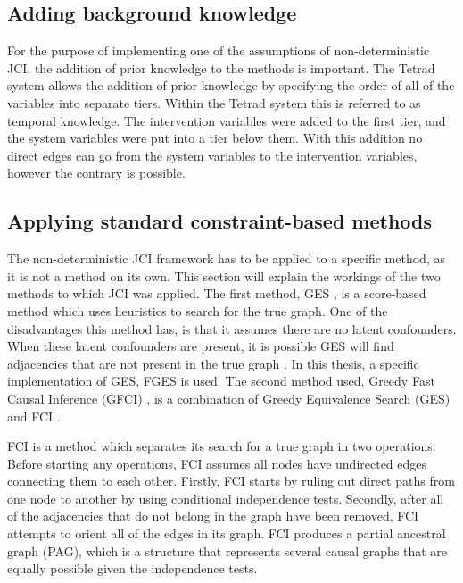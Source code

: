\documentclass[a4paper,pdf]{article}
\newcommand{\Sara}[1]{{\color{blue} Sara: #1}}
\begin{document}
\subsection{Adding background knowledge}
For the purpose of implementing one of the assumptions of non-deterministic JCI, the addition of prior knowledge to the methods is important. The Tetrad system allows the addition of prior knowledge by specifying the order of all of the variables into separate tiers. Within the Tetrad system this is referred to as temporal knowledge. The intervention variables were added to the first tier, and the system variables were put into a tier below them. With this addition no direct edges can go from the system variables to the intervention variables, however the contrary is possible. 

\subsection{Applying standard constraint-based methods}

The non-deterministic JCI framework has to be applied to a specific method, as it is not a method on its own. This section will explain the workings of the two methods to which JCI was applied. The first method, GES \cite{ges}, is a score-based method which uses heuristics to search for the true graph. One of the disadvantages this method has, is that it assumes there are no latent confounders. When these latent confounders are present, it is possible GES will find adjacencies that are not present in the true graph \cite[p.~372]{gfci}. In this thesis, a specific implementation of GES, FGES \cite{ges} is used. The second method used, Greedy Fast Causal Inference (GFCI) \cite{gfci}, is a combination of Greedy Equivalence Search (GES) and FCI \cite{fci}.  

FCI is a method which separates its search for a true graph in two operations. Before starting any operations, FCI assumes all nodes have undirected edges connecting them to each other. Firstly, FCI starts by ruling out direct paths from one node to another by using conditional independence tests. Secondly, after all of the adjacencies that do not belong in the graph have been removed, FCI attempts to orient all of the edges in its graph. FCI produces a partial ancestral graph (PAG), which is a structure that represents several causal graphs that are equally possible given the independence tests.
\end{document}
